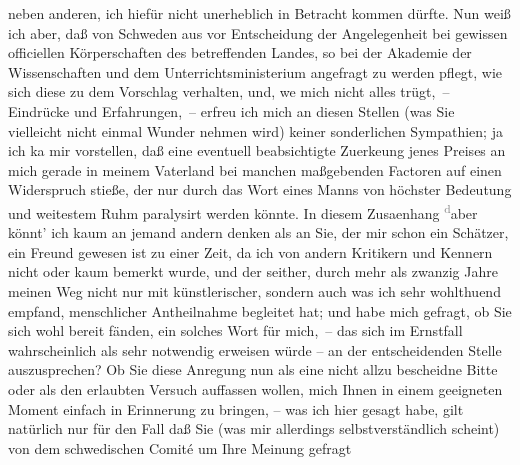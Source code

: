 \begin{ledgroupsized}[t]{13cm}
                    neben anderen, ich hiefür nicht unerheblich in Betracht kommen dürfte. Nun weiß
                    ich aber, daß von Schweden aus vor Entscheidung
                    der Angelegenheit bei gewissen officiellen Körperschaften des betreffenden
                    Landes, so bei der Akademie der Wissenschaften
                    und dem Unterrichtsministerium angefragt zu
                    werden pflegt, wie sich diese zu dem {\pb}Vorschlag verhalten, und, we{\geminationn} mich nicht alles
                    trügt, – Eindrücke und Erfahrungen, – erfreu ich mich an diesen Stellen (was Sie
                    vielleicht nicht einmal Wunder nehmen wird) keiner sonderlichen Sympathien; ja
                    ich ka{\geminationn} mir vorstellen, daß eine eventuell
                    beabsichtigte Zuerke{\geminationn}ung jenes Preises an mich
                    gerade in meinem Vaterland bei manchen maßgebenden Factoren auf einen
                    Widerspruch stieße, der nur durch das Wort eines Manns von höchster Bedeutung
                    und weitestem Ruhm paralysirt werden könnte. In diesem Zusa{\geminationm}enhang \substVorne{}\textsuperscript{\textcolor{gray}{d}}\substDazwischen{}a\substHinten{}ber könnt’ ich kaum an jemand andern denken als an Sie, der mir schon
                    ein Schätzer, ein {\pb}Freund gewesen ist zu
                    einer Zeit, da ich von andern Kritikern und Kennern nicht oder kaum bemerkt
                    wurde, und der seither, durch mehr als zwanzig Jahre meinen Weg nicht nur mit
                    künstlerischer, sondern \introOben{}auch\introOben{} was ich sehr wohlthuend
                    empfand, menschlicher Antheilnahme begleitet hat; und habe mich gefragt, ob Sie
                    sich wohl bereit fänden, ein solches Wort für mich, – das sich im Ernstfall
                    wahrscheinlich als sehr notwendig erweisen würde – an der entscheidenden Stelle
                    auszusprechen? Ob Sie \introOben{}\introOben{} diese Anregung nun als eine nicht allzu bescheidne Bitte oder als den
                    erlaubten Versuch auffassen wollen, mich Ihnen in einem geeigneten Moment
                    einfach in Erinnerung zu bringen, {\pb}– was ich
                    hier gesagt habe, gilt natürlich nur für den Fall daß Sie (was mir allerdings
                    selbstverständlich scheint) von dem schwedischen Comité um Ihre Meinung gefragt

\end{ledgroupsized}
